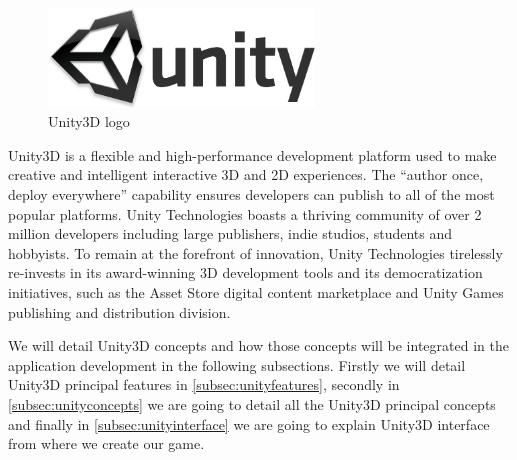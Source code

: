 \begin{figure}[h]
\centering
\includegraphics[width=200pt]{graphics/enabling-tech/unity_logo.png}
\caption{Unity3D logo}
\label{fig:unity_logo}
\end{figure}

Unity3D is a flexible and high-performance development platform used to make creative and intelligent interactive 3D and 2D experiences. The \enquote{author once, deploy everywhere} capability ensures developers can publish to all of the most popular platforms. Unity Technologies boasts a thriving community of over 2 million developers including large publishers, indie studios, students and hobbyists. To remain at the forefront of innovation, Unity Technologies tirelessly re-invests in its award-winning 3D development tools and its democratization initiatives, such as the Asset Store digital content marketplace and Unity Games publishing and distribution division.~\cite{unitypress1}

We will detail Unity3D concepts and how those concepts will be integrated in the application development in the following subsections. Firstly we will detail Unity3D principal features in \ref{subsec:unityfeatures}, secondly in \ref{subsec:unityconcepts} we are going to detail all the Unity3D principal concepts and finally in \ref{subsec:unityinterface} we are going to explain Unity3D interface from where we create our game. 

